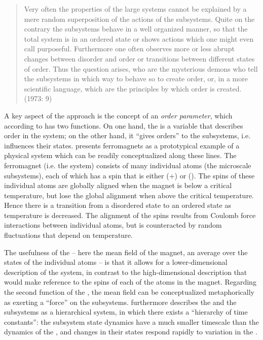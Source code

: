 \begin{quote}
    Very often the properties of the large systems cannot be explained by a mere random superposition of the actions of the subsystems. Quite on the contrary the subsystems behave in a well organized manner, so that the total system is in an ordered state or shows actions which one might even call purposeful. Furthermore one often observes more or less abrupt changes between disorder and order or transitions between different states of order. Thus the question arises, who are the mysterious demons who tell the subsystems in which way to behave so to create order, or, in a more scientific language, which are the principles by which order is created. (1973: 9)
\end{quote}

A key aspect of the  approach is the concept of an \textit{order parameter}, which according to  has two functions. On one hand, the  is a variable that describes order in the system; on the other hand, it “gives orders” \citep[10]{Haken1973} to the subsystems, i.e. influences their states.  presents ferromagnets as a prototypical example of a physical system which can be readily conceptualized along these lines. The ferromagnet (i.e. the  system) consists of many individual atoms (the microscale subsystems), each of which has a spin that is either (+) or (\textminus). The spins of these individual atoms are globally aligned when the magnet is below a critical temperature, but lose the global alignment when above the critical temperature. Hence there is a transition from a disordered state to an ordered state as temperature is decreased. The alignment of the spins results from Coulomb force interactions between individual atoms, but is counteracted by random fluctuations that depend on temperature. 

The usefulness of the  -- here the mean field of the magnet, an average over the states of the individual atoms -- is that it allows for a lower-di\-men\-sional description of the system, in contrast to the high-di\-men\-sional description that would make reference to the spins of each of the atoms in the magnet. Regarding the second function of the , the mean field can be conceptualized metaphorically as exerting a “force” on the subsystems.  furthermore describes the  and the subsystems as a hierarchical system, in which there exists a “hierarchy of time constants”: the subsystem state dynamics have a much smaller timescale than the dynamics of the , and changes in their states respond rapidly to variation in the . 

